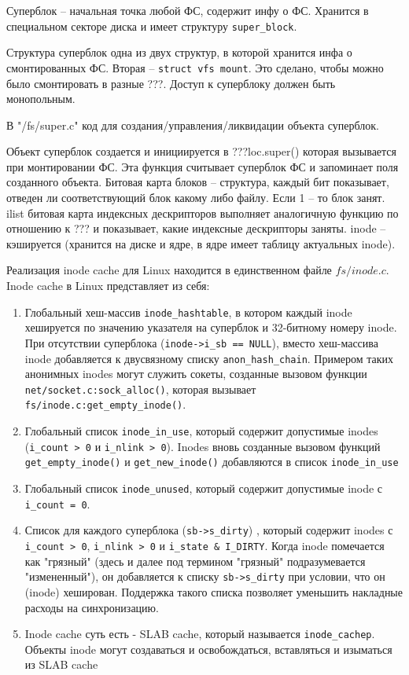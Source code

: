  

Суперблок – начальная точка любой ФС, содержит инфу о ФС. Хранится в специальном секторе диска и имеет структуру \verb|super_block|.

 

Структура суперблок одна из двух структур, в которой хранится инфа о смонтированных ФС. Вторая – \verb|struct vfs mount|. Это сделано, чтобы можно было смонтировать в разные ???. Доступ к суперблоку должен быть монопольным.

 

В "/fs/super.c" код для создания/управления/ликвидации объекта суперблок.

Объект суперблок создается и инициируется в ???loc.super() которая вызывается при монтировании ФС. Эта функция считывает суперблок ФС и запоминает поля созданного объекта. 
Битовая карта блоков – структура, каждый бит показывает, отведен ли соответствующий блок какому либо файлу. Если 1 – то блок занят.
ilist битовая карта индексных дескрипторов выполняет аналогичную функцию по отношению к ??? и показывает, какие индексные дескрипторы заняты. inode – кэшируется (хранится на диске и ядре, в ядре имеет таблицу актуальных inode).

Реализация inode cache для Linux находится в единственном файле $fs/inode.c$.
Inode cache в Linux представляет из себя:
\begin{enumerate}
	\item Глобальный хеш-массив \verb|inode_hashtable|, в котором каждый inode хешируется по значению указателя на суперблок и 32-битному номеру inode. При отсутствии суперблока (\verb|inode->i_sb == NULL|), вместо хеш-массива inode добавляется к двусвязному списку \verb|anon_hash_chain|. Примером таких анонимных inodes могут служить сокеты, созданные вызовом функции \verb|net/socket.c:sock_alloc()|, которая вызывает \verb|fs/inode.c:get_empty_inode()|.
	\item Глобальный список \verb|inode_in_use|, который содержит допустимые inodes (\verb|i_count > 0| и \verb|i_nlink > 0|). Inodes вновь созданные вызовом функций \verb|get_empty_inode()| и \verb|get_new_inode()| добавляются в список \verb|inode_in_use|
	\item Глобальный список \verb|inode_unused|, который содержит допустимые inode с \verb|i_count = 0|.
	\item Список для каждого суперблока (\verb|sb->s_dirty|) , который содержит inodes с \verb|i_count > 0|, \verb|i_nlink > 0| и \verb|i_state & I_DIRTY|. Когда inode помечается как "грязный" (здесь и далее под термином "грязный" подразумевается "измененный"), он добавляется к списку \verb|sb->s_dirty| при условии, что он (inode) хеширован. Поддержка такого списка позволяет уменьшить накладные расходы на синхронизацию.
	\item Inode cache суть есть - SLAB cache, который называется \verb|inode_cachep|. Объекты inode могут создаваться и освобождаться, вставляться и изыматься из SLAB cache
\end{enumerate}

